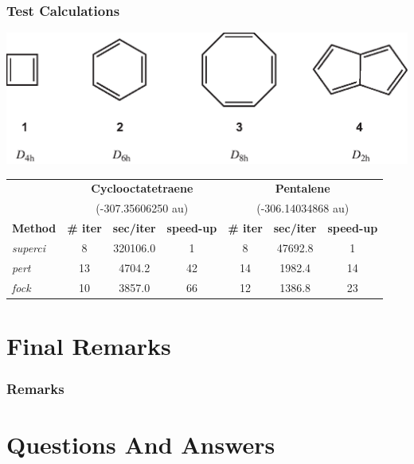 \documentclass[]{beamer}
\begin{document}
\begin{frame}
  \frametitle{Test Calculations}
  \begin{center}
    \includegraphics[scale=0.45]{figures/compounds.eps}
  \end{center}
  \begin{table}\small
    \begin{center}
      \begin{tabular}{l c c c c c c}
        \hline
        &\multicolumn{3}{c}{\textbf{Cyclooctatetraene}}&\multicolumn{3}{c}{\textbf{Pentalene}}\\
        &\multicolumn{3}{c}{(-307.35606250 au)}&\multicolumn{3}{c}{(-306.14034868 au)}\\
        \textbf{Method}&\textbf{\# iter}&\textbf{sec/iter}&\textbf{speed-up}&\textbf{\# iter}&\textbf{sec/iter}&\textbf{speed-up}\\
        \hline
        \textit{superci}&8&320106.0&1&8&47692.8&1\\
        \textit{pert}&13&4704.2&42&14&1982.4&14\\
        \textit{fock}&10&3857.0&66&12&1386.8&23\\
      \end{tabular}
    \end{center}
  \end{table}
\end{frame}


\section{Final Remarks}

\begin{frame}
  \frametitle{Remarks}
\end{frame}

\section{Questions And Answers}
\end{document}
